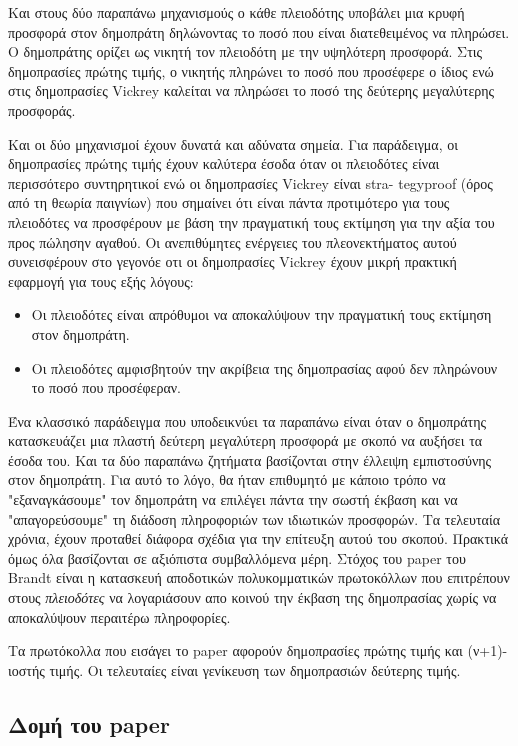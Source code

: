 \documentclass[letterpaper,11pt]{article}
\begin{document}
Και στους δύο παραπάνω μηχανισμούς ο κάθε πλειοδότης υποβάλει μια κρυφή προσφορά στον δημοπράτη δηλώνοντας το
ποσό που είναι διατεθειμένος να πληρώσει. Ο δημοπράτης ορίζει ως νικητή τον πλειοδότη με την υψηλότερη
προσφορά. Στις δημοπρασίες πρώτης τιμής, ο νικητής πληρώνει το ποσό που προσέφερε ο ίδιος ενώ στις δημοπρασίες
Vickrey καλείται να πληρώσει το ποσό της δεύτερης μεγαλύτερης προσφοράς.

Και οι δύο μηχανισμοί έχουν δυνατά και αδύνατα σημεία. Για παράδειγμα, οι δημοπρασίες πρώτης τιμής έχουν
καλύτερα έσοδα όταν οι πλειοδότες είναι περισσότερο συντηρητικοί ενώ οι δημοπρασίες Vickrey είναι
stra- tegyproof (όρος από τη θεωρία παιγνίων) που σημαίνει ότι είναι πάντα προτιμότερο για τους πλειοδότες να
προσφέρουν με βάση την πραγματική τους εκτίμηση για την αξία του προς πώλησην αγαθού. Οι ανεπιθύμητες
ενέργειες του πλεονεκτήματος αυτού συνεισφέρουν στο γεγονόε οτι οι δημοπρασίες Vickrey έχουν μικρή πρακτική
εφαρμογή για τους εξής λόγους:

\begin{itemize}
	\item Οι πλειοδότες είναι απρόθυμοι να αποκαλύψουν την πραγματική τους εκτίμηση στον δημοπράτη. 
	\item Οι πλειοδότες αμφισβητούν την ακρίβεια της δημοπρασίας αφού δεν πληρώνουν το ποσό που προσέφεραν.
\end{itemize}

Ένα κλασσικό παράδειγμα που υποδεικνύει τα παραπάνω είναι όταν ο δημοπράτης κατασκευάζει μια πλαστή δεύτερη
μεγαλύτερη προσφορά με σκοπό να αυξήσει τα έσοδα του. Και τα δύο παραπάνω ζητήματα βασίζονται στην έλλειψη
εμπιστοσύνης στον δημοπράτη. Για αυτό το λόγο, θα ήταν επιθυμητό με κάποιο τρόπο να "εξαναγκάσουμε" τον
δημοπράτη να επιλέγει πάντα την σωστή έκβαση και να "απαγορεύσουμε" τη διάδοση πληροφοριών των ιδιωτικών
προσφορών. Τα τελευταία χρόνια, έχουν προταθεί διάφορα σχέδια για την επίτευξη αυτού του σκοπού. Πρακτικά όμως
όλα βασίζονται σε αξιόπιστα συμβαλλόμενα μέρη. Στόχος του paper του Brandt είναι η κατασκευή αποδοτικών
πολυκομματικών πρωτοκόλλων που επιτρέπουν στους \emph{πλειοδότες} να λογαριάσουν απο κοινού την έκβαση της
δημοπρασίας χωρίς να αποκαλύψουν περαιτέρω πληροφορίες.

Τα πρωτόκολλα που εισάγει το paper αφορούν δημοπρασίες πρώτης τιμής και (ν+1)-ιοστής τιμής. Οι τελευταίες
είναι γενίκευση των δημοπρασιών δεύτερης τιμής.

\subsection{Δομή του paper}
\end{document}
